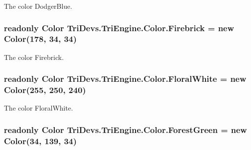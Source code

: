 The color Dodger\-Blue. 

\hypertarget{struct_tri_devs_1_1_tri_engine_1_1_color_a184ce9caad503386de58a65baac4398d}{
\subsubsection[{Firebrick}]{\setlength{\rightskip}{0pt plus 5cm}readonly {\bf Color} Tri\-Devs.\-Tri\-Engine.\-Color.\-Firebrick = new {\bf Color}(178, 34, 34)\hspace{0.3cm}{\ttfamily [static]}}}\label{struct_tri_devs_1_1_tri_engine_1_1_color_a184ce9caad503386de58a65baac4398d}


The color Firebrick. 

\hypertarget{struct_tri_devs_1_1_tri_engine_1_1_color_a93ded427940b0600cd3e487a0f43bf3d}{
\subsubsection[{Floral\-White}]{\setlength{\rightskip}{0pt plus 5cm}readonly {\bf Color} Tri\-Devs.\-Tri\-Engine.\-Color.\-Floral\-White = new {\bf Color}(255, 250, 240)\hspace{0.3cm}{\ttfamily [static]}}}\label{struct_tri_devs_1_1_tri_engine_1_1_color_a93ded427940b0600cd3e487a0f43bf3d}


The color Floral\-White. 

\hypertarget{struct_tri_devs_1_1_tri_engine_1_1_color_af63bc7371a1abce993b11655062cc73f}{
\subsubsection[{Forest\-Green}]{\setlength{\rightskip}{0pt plus 5cm}readonly {\bf Color} Tri\-Devs.\-Tri\-Engine.\-Color.\-Forest\-Green = new {\bf Color}(34, 139, 34)\hspace{0.3cm}{\ttfamily [static]}}}\label{struct_tri_devs_1_1_tri_engine_1_1_color_af63bc7371a1abce993b11655062cc73f}


